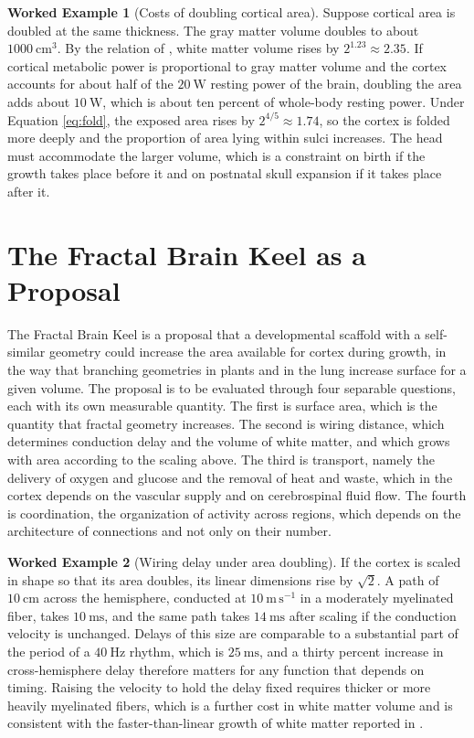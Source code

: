 \documentclass[11pt,openany]{book}
\theoremstyle{definition}
\newtheorem{example}{Worked Example}[chapter]
\theoremstyle{remark}
\begin{document}
\begin{example}[Costs of doubling cortical area]
\label{ex:cortex}
Suppose cortical area is doubled at the same thickness. The gray matter volume doubles to about $1000\ \mathrm{cm^{3}}$. By the relation of \cite{zhang2000}, white matter volume rises by $2^{1.23}\approx2.35$. If cortical metabolic power is proportional to gray matter volume and the cortex accounts for about half of the $20\ \mathrm{W}$ resting power of the brain, doubling the area adds about $10\ \mathrm{W}$, which is about ten percent of whole-body resting power. Under Equation \eqref{eq:fold}, the exposed area rises by $2^{4/5}\approx1.74$, so the cortex is folded more deeply and the proportion of area lying within sulci increases. The head must accommodate the larger volume, which is a constraint on birth if the growth takes place before it and on postnatal skull expansion if it takes place after it.
\end{example}

\section{The Fractal Brain Keel as a Proposal}

The Fractal Brain Keel is a proposal that a developmental scaffold with a self-similar geometry could increase the area available for cortex during growth, in the way that branching geometries in plants and in the lung increase surface for a given volume. The proposal is to be evaluated through four separable questions, each with its own measurable quantity. The first is surface area, which is the quantity that fractal geometry increases. The second is wiring distance, which determines conduction delay and the volume of white matter, and which grows with area according to the scaling above. The third is transport, namely the delivery of oxygen and glucose and the removal of heat and waste, which in the cortex depends on the vascular supply and on cerebrospinal fluid flow. The fourth is coordination, the organization of activity across regions, which depends on the architecture of connections and not only on their number.

\begin{example}[Wiring delay under area doubling]
\label{ex:wiringdelay}
If the cortex is scaled in shape so that its area doubles, its linear dimensions rise by $\sqrt{2}$. A path of $10\ \mathrm{cm}$ across the hemisphere, conducted at $10\ \mathrm{m\,s^{-1}}$ in a moderately myelinated fiber, takes $10\ \mathrm{ms}$, and the same path takes $14\ \mathrm{ms}$ after scaling if the conduction velocity is unchanged. Delays of this size are comparable to a substantial part of the period of a $40\ \mathrm{Hz}$ rhythm, which is $25\ \mathrm{ms}$, and a thirty percent increase in cross-hemisphere delay therefore matters for any function that depends on timing. Raising the velocity to hold the delay fixed requires thicker or more heavily myelinated fibers, which is a further cost in white matter volume and is consistent with the faster-than-linear growth of white matter reported in \cite{zhang2000}.
\end{example}
\end{document}
